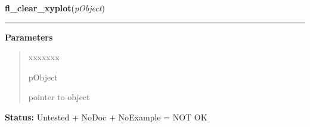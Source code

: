     \label{xformslib:library:fl_clear_xyplot}

    \vspace{0.5ex}

\hspace{.8\funcindent}\begin{boxedminipage}{\funcwidth}

    \raggedright \textbf{fl\_clear\_xyplot}(\textit{pObject})

    \vspace{-1.5ex}

    \rule{\textwidth}{0.5\fboxrule}
\setlength{\parskip}{2ex}
\setlength{\parskip}{1ex}
      \textbf{Parameters}
      \vspace{-1ex}

      \begin{quote}
        \begin{Ventry}{xxxxxxx}

          \item[pObject]

          pointer to object

        \end{Ventry}

      \end{quote}

\textbf{Status:} Untested + NoDoc + NoExample = NOT OK



    \end{boxedminipage}

    \label{xformslib:library:fl_set_xyplot_linewidth}

    \vspace{0.5ex}

